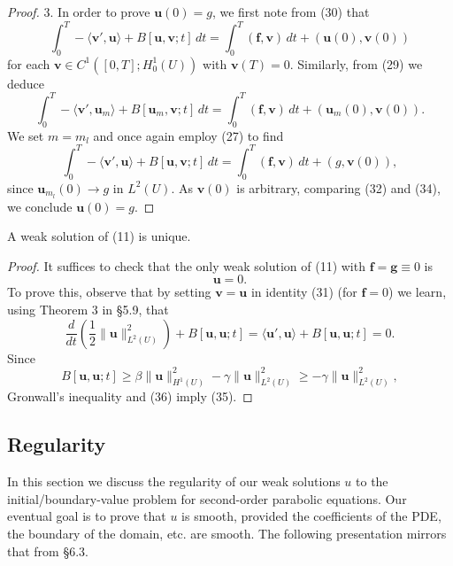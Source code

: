 \begin{proof}
3. In order to prove $\mathbf{u}(0) = g$, we first note from (30) that
\[
\int_0^T -\langle \mathbf{v}', \mathbf{u} \rangle + B[\mathbf{u}, \mathbf{v}; t] \, dt = \int_0^T (\mathbf{f}, \mathbf{v}) \, dt + (\mathbf{u}(0), \mathbf{v}(0))
\tag{32}
\]
for each $\mathbf{v} \in C^1([0,T]; H_0^1(U))$ with $\mathbf{v}(T) = 0$. Similarly, from (29) we deduce
\[
\int_0^T -\langle \mathbf{v}', \mathbf{u}_m \rangle + B[\mathbf{u}_m, \mathbf{v}; t] \, dt = \int_0^T (\mathbf{f}, \mathbf{v}) \, dt + (\mathbf{u}_m(0), \mathbf{v}(0)).
\tag{33}
\]
We set $m = m_l$ and once again employ (27) to find
\[
\int_0^T -\langle \mathbf{v}', \mathbf{u} \rangle + B[\mathbf{u}, \mathbf{v}; t] \, dt = \int_0^T (\mathbf{f}, \mathbf{v}) \, dt + (g, \mathbf{v}(0)),
\tag{34}
\]
since $\mathbf{u}_{m_l}(0) \to g$ in $L^2(U)$. As $\mathbf{v}(0)$ is arbitrary, comparing (32) and (34), we conclude $\mathbf{u}(0) = g$.
\end{proof}

\begin{theorem}
\label{thm:parabolic-uniqueness-weak-solution}
A weak solution of (11) is unique.
\end{theorem}

\begin{proof}
It suffices to check that the only weak solution of (11) with $\mathbf{f} = \mathbf{g} \equiv 0$ is
\[
\mathbf{u} = 0.
\tag{35}
\]
To prove this, observe that by setting $\mathbf{v} = \mathbf{u}$ in identity (31) (for $\mathbf{f} = 0$) we learn, using Theorem 3 in \S5.9, that
\[
\frac{d}{dt}\left(\frac{1}{2}\|\mathbf{u}\|^2_{L^2(U)}\right) + B[\mathbf{u},\mathbf{u};t] = \langle \mathbf{u}', \mathbf{u}\rangle + B[\mathbf{u},\mathbf{u};t] = 0.
\tag{36}
\]
Since
\[
B[\mathbf{u},\mathbf{u};t] \geq \beta\|\mathbf{u}\|^2_{H^1(U)} - \gamma\|\mathbf{u}\|^2_{L^2(U)} \geq -\gamma\|\mathbf{u}\|^2_{L^2(U)},
\]
Gronwall's inequality and (36) imply (35).
\end{proof}

\subsection{Regularity}

In this section we discuss the regularity of our weak solutions $u$ to the initial/boundary-value problem for second-order parabolic equations. Our eventual goal is to prove that $u$ is smooth, provided the coefficients of the PDE, the boundary of the domain, etc. are smooth. The following presentation mirrors that from \S6.3.

